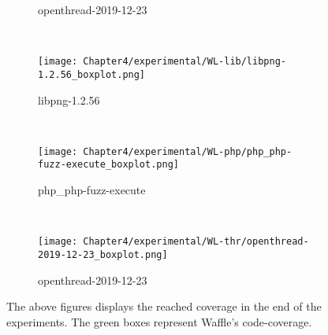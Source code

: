 \begin{figure}[!t]
\begin{adjustbox}{center,max width=1.3\textwidth}
\begin{subfigure}[t]{0.3\textwidth}
            \vspace*{-5mm}
            \caption{openthread-2019-12-23}
            \label{box:e}
            \vspace*{5mm}
        \end{subfigure}
        ~
        \begin{subfigure}[t]{0.3\textwidth}
            \centering
            \texttt{[image: Chapter4/experimental/WL-lib/libpng-1.2.56\_boxplot.png]}
            \vspace*{-5mm}
            \caption{libpng-1.2.56}
            \label{box:f}
            \vspace*{5mm}
        \end{subfigure}
    \end{adjustbox}
    ~
    \begin{adjustbox}{center,max width=1.3\textwidth}
        \begin{subfigure}[t]{0.3\textwidth}
            \centering
            \texttt{[image: Chapter4/experimental/WL-php/php\_php-fuzz-execute\_boxplot.png]}
            \vspace*{-5mm}
            \caption{php\_php-fuzz-execute}
            \label{box:g}
            \vspace*{5mm}
        \end{subfigure}
        ~
        \begin{subfigure}[t]{0.3\textwidth}
            \centering
            \texttt{[image: Chapter4/experimental/WL-thr/openthread-2019-12-23\_boxplot.png]}
            \vspace*{-5mm}
            \caption{openthread-2019-12-23}
            \label{box:h}
            \vspace*{5mm}
        \end{subfigure}
    \end{adjustbox}
    \caption{The above figures displays the reached coverage in the end of the experiments. The green boxes represent Waffle's code-coverage.}
    \label{fig:report-box}
\end{figure}



